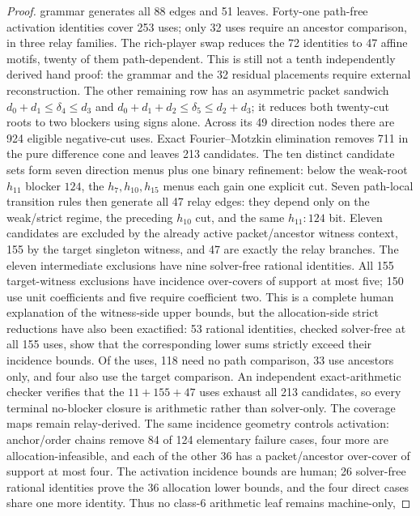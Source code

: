 \documentclass[11pt]{article}
\begin{document}
\begin{proof}
grammar generates all 88 edges and 51 leaves.  Forty-one path-free activation
identities cover 253 uses; only 32 uses require an ancestor comparison, in
three relay families.  The rich-player swap reduces the 72 identities to 47
affine motifs, twenty of them path-dependent.  This is still not a tenth
independently derived hand proof: the grammar and the 32 residual placements
require external reconstruction.  The other remaining row has an asymmetric packet sandwich
$d_0+d_1\leq\delta_4\leq d_3$ and
$d_0+d_1+d_2\leq\delta_5\leq d_2+d_3$; it reduces both twenty-cut roots to
two blockers using signs alone.  Across its 49 direction nodes there are 924
eligible negative-cut uses.  Exact Fourier--Motzkin elimination removes 711
in the pure difference cone and leaves 213 candidates.  The ten distinct
candidate sets form seven direction menus plus one binary refinement: below
the weak-root $h_{11}$ blocker $124$, the $h_7,h_{10},h_{15}$ menus each gain
one explicit cut.  Seven path-local transition rules then generate all 47
relay edges: they depend only on the weak/strict regime, the preceding
$h_{10}$ cut, and the same $h_{11}:124$ bit.  Eleven candidates are excluded by the already active
packet/ancestor witness context, 155 by the target singleton witness, and 47
are exactly the relay branches.  The eleven intermediate exclusions have nine
solver-free rational identities.  All 155 target-witness exclusions have
incidence over-covers of support at
most five; 150 use unit coefficients and five require coefficient two.  This
is a complete human explanation of the witness-side upper bounds, but the
allocation-side strict reductions have also been exactified: 53 rational
identities, checked solver-free at all 155 uses, show that the corresponding
lower sums strictly exceed their incidence bounds.  Of the uses, 118 need no
path comparison, 33 use ancestors only, and four also use the target
comparison.  An independent exact-arithmetic checker verifies that the
$11+155+47$ uses exhaust all 213 candidates, so every terminal no-blocker
closure is arithmetic rather than solver-only.  The coverage maps remain
relay-derived.
The same incidence geometry controls activation: anchor/order chains remove
84 of 124 elementary failure cases, four more are allocation-infeasible, and
each of the other 36 has a packet/ancestor over-cover of support at most four.
The activation incidence bounds are human; 26 solver-free rational identities
prove the 36 allocation lower bounds, and the four direct cases share one
more identity.  Thus no class-6 arithmetic leaf remains machine-only,

\end{proof}
\end{document}
